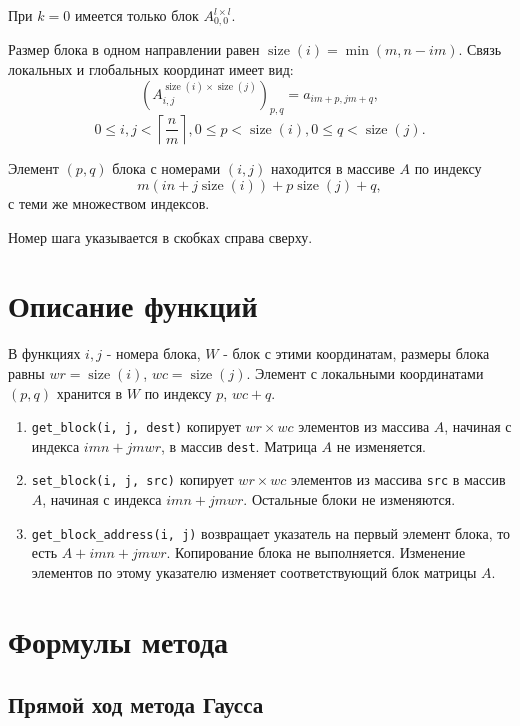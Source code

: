 \documentclass[a4paper,12pt]{article}
\begin{document}
При $k = 0$ имеется только блок $A_{0, 0}^{l \times l}$.

Размер блока в одном направлении равен $\operatorname{size}(i) = \min(m, n - i m)$. Связь локальных и глобальных координат имеет вид:
\[
    \left(A_{i, j}^{\operatorname{size}(i) \times \operatorname{size}(j)} \right)_{p, q} = a_{i m + p, j m + q},
\]
\[
    0 \leq i, j < \left\lceil \frac{n}{m} \right\rceil, 0 \leq p < \operatorname{size}(i), 0 \leq q < \operatorname{size}(j).
\]

Элемент $(p, q)$ блока с номерами $(i, j)$ находится в массиве $A$ по индексу
\[
    m (i n + j \operatorname{size}(i)) + p \operatorname{size}(j) + q,
\]
с теми же множеством индексов.

Номер шага указывается в скобках справа сверху.

\section{Описание функций}
В функциях $i, j$ - номера блока, $W$ - блок с этими координатам, размеры блока равны $wr = \operatorname{size}(i)$, $wc = \operatorname{size}(j)$. Элемент с локальными координатами $(p, q)$ хранится в $W$ по индексу $p$, $wc + q$.

\begin{enumerate}
    \item \texttt{get\_block(i, j, dest)} копирует $wr \times wc$ элементов из массива $A$, начиная с индекса $i m n + j m wr$, в массив \texttt{dest}. Матрица $A$ не изменяется.
    \item \texttt{set\_block(i, j, src)} копирует $wr \times wc$ элементов из массива \texttt{src} в массив $A$, начиная с индекса $i m n + j m wr$. Остальные блоки не изменяются.
    \item \texttt{get\_block\_address(i, j)} возвращает указатель на первый элемент блока, то есть $A + i m n + j m wr$. Копирование блока не выполняется. Изменение элементов по этому указателю изменяет соответствующий блок матрицы $A$.
\end{enumerate}

\section{Формулы метода}
\subsection{Прямой ход метода Гаусса}
\end{document}
